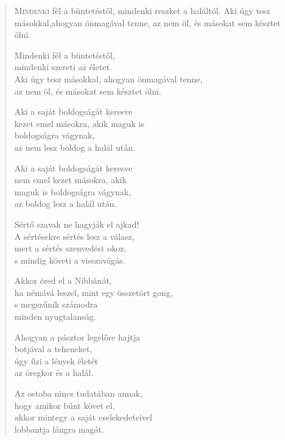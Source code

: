 
\vspace*{-\baselineskip}
\begin{verse}

{\par%
\lettrine{M}{indenki} {\LettrineTextFont fél a büntetéstől,}\newline
mindenki reszket a haláltól.\newline
Aki úgy tesz másokkal,\verselinebreak ahogyan önmagával tenne,\verselinebreak
az nem öl, és másokat sem késztet ölni.
\par}

 Mindenki fél a büntetéstől,\\
mindenki szereti az életet.\\
Aki úgy tesz másokkal, ahogyan önmagával tenne,\\
az nem öl, és másokat sem késztet ölni.

 Aki a saját boldogságát keresve\\
kezet emel másokra, akik maguk is\\
boldogságra vágynak,\\
az nem lesz boldog a halál után.

 Aki a saját boldogságát keresve\\
nem emel kezet másokra, akik\\
maguk is boldogságra vágynak,\\
az boldog lesz a halál után.

 Sértő szavak ne hagyják el ajkad!\\
A sértésekre sértés lesz a válasz,\\
mert a sértés szenvedést okoz,\\
s mindig követi a visszavágás.

 Akkor éred el a Nibbánát,\\
ha némává leszel, mint egy összetört gong,\\
s megszűnik számodra\\
minden nyugtalanság.

 Ahogyan a pásztor legelőre hajtja\\
botjával a teheneket,\\
úgy űzi a lények életét\\
az öregkor és a halál.

 Az ostoba nincs tudatában annak,\\
hogy amikor bűnt követ el,\\
akkor mintegy a saját cselekedeteivel\\
lobbantja lángra magát.


\end{verse}
